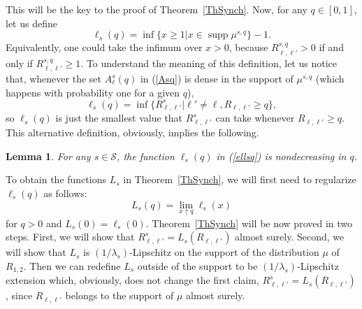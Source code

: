 \documentclass[aop,MSNbibl,dvips]{arximspdf}
\def\cal{\mathscr}
\newcommand{\spe}{{\cal S}}
\newtheorem{lemma}{Lemma}
\begin{document}
This will be the key to the proof of Theorem~\ref{ThSynch}. Now, for
any $q\in[0,1]$, let us define
%
\begin{equation}
\ell_s(q) = \inf \bigl\{x\geq1 | x\in\operatorname{supp} \mu^{s,q}
\bigr\}-1. \label{ellsq}
\end{equation}
%
Equivalently, one could take the infimum over $x>0$, because
$R^{s,q}_{\ell,\ell'}>0$ if and only if $R^{s,q}_{\ell,\ell'}\geq1$.
To understand the meaning of this definition, let us notice that,
whenever the set $A^{s}_\ell(q)$ in (\ref{Asq}) is dense in the support
of $\mu^{s,q}$ (which happens with probability one for a given $q$),
%
\begin{equation}
\ell_s(q) = \inf \bigl\{R^s_{\ell,\ell'} |
\ell'\neq\ell, R_{\ell
,\ell'} \geq q \bigr\}, \label{ellsq2}
\end{equation}
%
so $\ell_s(q)$ is just the smallest value that $R^s_{\ell,\ell'}$ can
take whenever $R_{\ell, \ell'}\geq q$. This alternative definition,
obviously, implies the following.

\begin{lemma}
For any $s\in\spe$, the function $\ell_s(q)$ in (\ref{ellsq}) is
nondecreasing in $q$.
\end{lemma}
%

To obtain the functions $L_s$ in Theorem~\ref{ThSynch}, we will first
need to regularize $\ell_s(q)$ as follows:
%
\begin{equation}
L_s(q) = \lim_{x\uparrow q} \ell_s(x)
\end{equation}
%
for $q>0$ and $L_s(0) = \ell_s(0)$. Theorem~\ref{ThSynch} will be now
proved in two steps. First, we will show that $R^s_{\ell,\ell'} =
L_s(R_{\ell,\ell'})$ almost surely. Second, we will show that $L_s$ is
$(1/\lambda_s)$-Lipschitz on the support of the distribution $\mu$ of
$R_{1,2}$. Then we can redefine $L_s$ outside of the support to be
$(1/\lambda_s)$-Lipschitz extension which, obviously, does not change
the first claim, $R^s_{\ell,\ell'} = L_s(R_{\ell,\ell'})$, since
$R_{\ell,\ell'}$ belongs to the support of $\mu$ almost surely.
\end{document}

